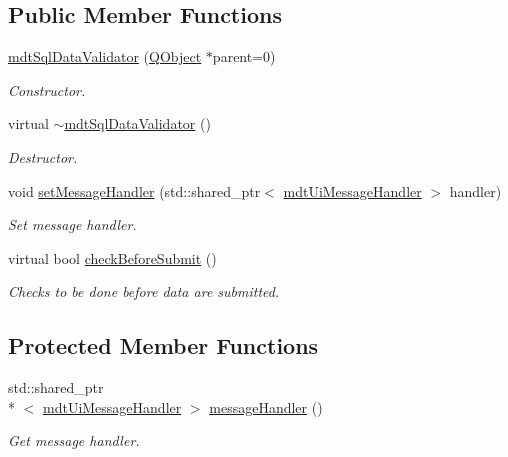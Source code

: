 \subsection*{Public Member Functions}
\begin{DoxyCompactItemize}
\item 
\hyperlink{classmdt_sql_data_validator_a24a295e08cac39244b35d409f48095f6}{mdt\-Sql\-Data\-Validator} (\hyperlink{class_q_object}{Q\-Object} $\ast$parent=0)
\begin{DoxyCompactList}\small\item\em Constructor. \end{DoxyCompactList}\item 
virtual \hyperlink{classmdt_sql_data_validator_a2d1348a7035ac4fcf4f4cd47a6c2fa52}{$\sim$mdt\-Sql\-Data\-Validator} ()
\begin{DoxyCompactList}\small\item\em Destructor. \end{DoxyCompactList}\item 
void \hyperlink{classmdt_sql_data_validator_af09f6966469821b8e5d569bff0f51834}{set\-Message\-Handler} (std\-::shared\-\_\-ptr$<$ \hyperlink{classmdt_ui_message_handler}{mdt\-Ui\-Message\-Handler} $>$ handler)
\begin{DoxyCompactList}\small\item\em Set message handler. \end{DoxyCompactList}\item 
virtual bool \hyperlink{classmdt_sql_data_validator_af291c18e9c8994085ed4664db3fdcb7c}{check\-Before\-Submit} ()
\begin{DoxyCompactList}\small\item\em Checks to be done before data are submitted. \end{DoxyCompactList}\end{DoxyCompactItemize}
\subsection*{Protected Member Functions}
\begin{DoxyCompactItemize}
\item 
std\-::shared\-\_\-ptr\\*
$<$ \hyperlink{classmdt_ui_message_handler}{mdt\-Ui\-Message\-Handler} $>$ \hyperlink{classmdt_sql_data_validator_a56a4c215433676645ace1b5646fc1198}{message\-Handler} ()
\begin{DoxyCompactList}\small\item\em Get message handler. \end{DoxyCompactList}\end{DoxyCompactItemize}


